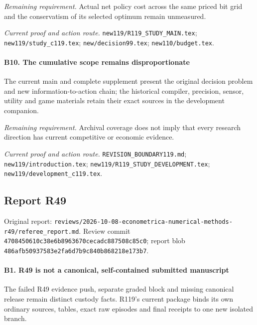 \par\emph{Remaining requirement.} Actual net policy cost across the same priced bit grid and the conservatism of its selected optimum remain unmeasured.

\par\emph{Current proof and action route.} \nolinkurl{new119/R119_STUDY_MAIN.tex}; \nolinkurl{new119/study_c119.tex}; \nolinkurl{new/decision99.tex}; \nolinkurl{new110/budget.tex}.

\paragraph{B10. The cumulative scope remains disproportionate}

The current main and complete supplement present the original decision problem and new information-to-action chain; the historical compiler, precision, sensor, utility and game materials retain their exact sources in the development companion.

\par\emph{Remaining requirement.} Archival coverage does not imply that every research direction has current competitive or economic evidence.

\par\emph{Current proof and action route.} \nolinkurl{REVISION_BOUNDARY119.md}; \nolinkurl{new119/introduction.tex}; \nolinkurl{new119/R119_STUDY_DEVELOPMENT.tex}; \nolinkurl{new119/development_c119.tex}.

\subsection{Report R49}

Original report: \nolinkurl{reviews/2026-10-08-econometrica-numerical-methods-r49/referee_report.md}. Review commit \nolinkurl{4708450610c38e6b8963670cecadc887508c85c0}; report blob \nolinkurl{486afb50937583e2fa6d7b9c840b868218e173b7}.

\paragraph{B1. R49 is not a canonical, self-contained submitted manuscript}

The failed R49 evidence push, separate graded block and missing canonical release remain distinct custody facts. R119's current package binds its own ordinary sources, tables, exact raw episodes and final receipts to one new isolated branch.

